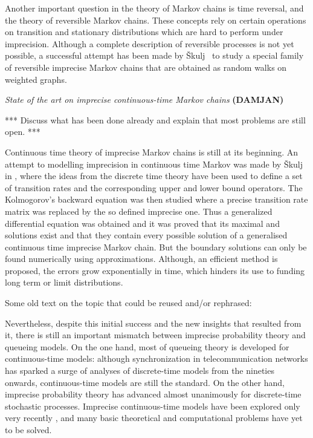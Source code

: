 \documentclass[11pt,dvipsnames,usenames,a4paper]{article}
\begin{document}
Another important question in the theory of Markov chains is time reversal, and the theory of reversible Markov chains. These concepts rely on certain operations on transition and stationary distributions which are hard to perform under imprecision. Although a complete description of reversible processes is not yet possible, a successful attempt has been made by Škulj~\cite{skulj:16} to study a special family of reversible imprecise Markov chains that are obtained as random walks on weighted graphs. 


\emph{State of the art on imprecise continuous-time Markov chains} {\bf\color{blue} (DAMJAN)}

*** Discuss what has been done already and explain that most problems are still open. ***

Continuous time theory of imprecise Markov chains is still at its beginning. An attempt to modelling imprecision in continuous time Markov was made by Škulj in \cite{skulj2015}, where the ideas from the discrete time theory have been used to define a set of transition rates and the corresponding upper and lower bound operators. The Kolmogorov's backward equation was then studied where a precise transition rate matrix was replaced by the so defined imprecise one. Thus a generalized differential equation was obtained and it was proved that its maximal and solutions exist and that they contain every possible solution of a generalised continuous time imprecise Markov chain. But the boundary solutions can only be found numerically using approximations. Although, an efficient method is proposed, the errors grow exponentially in time, which hinders its use to funding long term or limit distributions.


{\color{Gray}
Some old text on the topic that could be reused and/or rephrased:



Nevertheless, despite this initial success and the new insights that resulted from it, there is still an important mismatch between imprecise probability theory and queueing models.
On the one hand, most of queueing theory is developed for continuous-time models: although synchronization in telecommunication networks has sparked a surge of analyses of discrete-time models from the nineties onwards, continuous-time models are still the standard.
On the other hand, imprecise probability theory has advanced almost unanimously for discrete-time stochastic processes.
Imprecise continuous-time models have been explored only very recently \cite{Skulj2015,Troffaes+GSB-ISIPTA15p}, and many basic theoretical and computational problems have yet to be solved.
}
\end{document}

